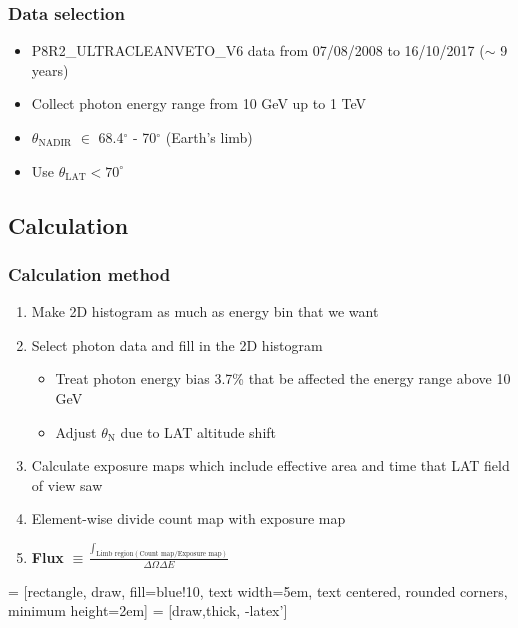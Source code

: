 \documentclass{beamer}
\begin{document}
\begin{frame}
\frametitle{Data selection}
\begin{itemize}
  \item P8R2\_ULTRACLEANVETO\_V6 data from 07/08/2008 to 16/10/2017 ($\sim$ 9 years) %
  \item Collect photon energy range from 10 GeV up to 1 TeV
  \item $\theta_{\text{NADIR}}$ $\in$ 68.4$^\circ$  - 70$^\circ$ (Earth's limb)
  \item Use $\theta_{\text{LAT}} < 70^\circ$
\end{itemize}
\end{frame}
\subsection{Calculation}
\begin{frame}
\frametitle{Calculation method}
\begin{enumerate}
  \item Make 2D histogram as much as energy bin that we want
  \item Select photon data and fill in the 2D histogram
  \begin{itemize}
    \item Treat photon energy bias 3.7\% that be affected the energy range above 10 GeV
    \item Adjust $\theta_\text{N}$ due to LAT altitude shift
  \end{itemize}
  \item Calculate exposure maps which include effective area
  and time that LAT field of view saw
  \item Element-wise divide count map with exposure map
  \item \textbf{Flux} $\equiv \frac{\int_{\text{Limb region}(\text{Count map}/\text{Exposure map})}}{\Delta\Omega\Delta E }$
\end{enumerate}
\end{frame}


   = [rectangle, draw, fill=blue!10, 
  text width=5em, text centered, rounded corners, minimum height=2em]
   = [draw,thick, -latex']
\end{document}
